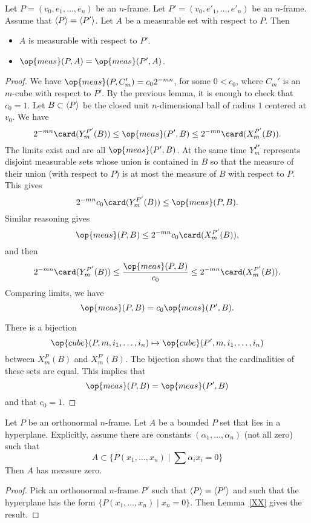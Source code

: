 \begin{lemma}  Let $P = (v_0,e_1,\ldots,e_n)$ be an $n$-frame.
Let $P' = (v_0,e'_1,\ldots,e'_n)$ be an $n$-frame.  Assume that
${\langle P\rangle} = {\langle P'\rangle}$.  Let $A$ be a measurable set with respect
to $P$.  Then
    \begin{itemize}
        \item $A$ is measurable with respect to $P'$.
        \item $\op{meas}(P,A) = \op{meas}(P',A)$.
    \end{itemize}
\end{lemma}

\begin{proof}
We have $\op{meas}(P,C'_m) = c_0 2^{-m n}$, for some $0 < c_0$,
where $C_m'$ is an $m$-cube with respect to $P'$. By the previous
lemma, it is enough to check that $c_0=1$.  Let $B\subset {\langle P\rangle}$
be the closed unit $n$-dimensional ball of radius $1$ centered at
$v_0$.  We have
    $$2^{-m n} \card(Y^{P'}_m(B)) \le \op{meas}(P',B)
    \le 2^{- m n} \card(X^{P'}_m(B)).$$
The limits exist and are all $\op{meas}(P',B)$. At the same time
$Y^{P'}_m$ represents disjoint measurable sets whose union is
contained in $B$ so that the measure of their union (with respect to
$P$) is at most the measure of $B$ with respect to $P$.  This gives
$$2^{-m n} c_0 \card(Y^{P'}_m(B)) \le \op{meas}(P,B).$$
Similar reasoning gives
$$\op{meas}(P,B)
    \le 2^{- m n} c_0\card(X^{P'}_m(B)),$$ and then
$$2^{-m n} \card(Y^{P'}_m(B)) \le \frac{\op{meas}(P,B)}{c_0}
    \le 2^{- m n} \card(X^{P'}_m(B)).$$
Comparing limits, we have
  $$\op{meas}(P,B) = c_0 \op{meas}(P',B).$$

There is a bijection
    $$\op{cube}(P,m,i_1,\ldots,i_n)\mapsto
    \op{cube}(P',m,i_1,\ldots,i_n)
    $$
between $X^P_m(B)$ and $X^{P'}_m(B)$. The bijection shows that the
cardinalities of these sets are equal. This implies that
    $$\op{meas}(P,B) = \op{meas}(P',B)$$
and that $c_0 = 1$.
\end{proof}

\begin{lemma}  Let $P$ be an orthonormal $n$-frame.  Let $A$ be a
bounded $P$ set that lies in a hyperplane.  Explicitly, assume there
are constants $(\alpha_1,\ldots,\alpha_n)$ (not all zero) such that
    $$A \subset \{P(x_1,\ldots,x_n)\mid \sum \alpha_i x_i = 0\}$$
Then $A$ has measure zero.
\end{lemma}

\begin{proof} Pick an orthonormal $n$-frame $P'$ such that
${\langle P\rangle} = {\langle P'\rangle}$ and such that the hyperplane has the form
$\{P(x_1,\ldots,x_n)\mid x_n = 0\}$.  Then Lemma~\ref{XX} gives the
result.
\end{proof}

